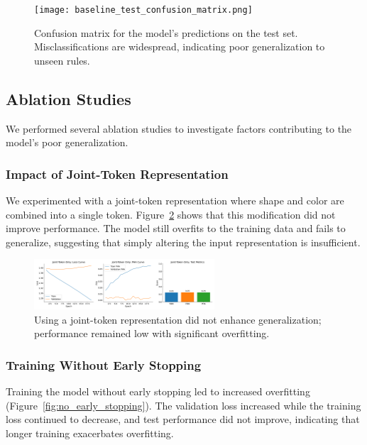 \documentclass{article} %
\begin{document}
\begin{figure}[h!]
\centering
\texttt{[image: baseline\_test\_confusion\_matrix.png]}
\caption{Confusion matrix for the model's predictions on the test set. Misclassifications are widespread, indicating poor generalization to unseen rules.}
\label{fig:test_confusion}
\end{figure}

\subsection{Ablation Studies}

We performed several ablation studies to investigate factors contributing to the model's poor generalization.

\subsubsection{Impact of Joint-Token Representation}

We experimented with a joint-token representation where shape and color are combined into a single token. Figure~\ref{fig:joint_token} shows that this modification did not improve performance. The model still overfits to the training data and fails to generalize, suggesting that simply altering the input representation is insufficient.

\begin{figure}[h!]
\centering
\includegraphics[width=0.6\textwidth]{joint_token_only_combined.png}
\caption{Using a joint-token representation did not enhance generalization; performance remained low with significant overfitting.}
\label{fig:joint_token}
\end{figure}

\subsubsection{Training Without Early Stopping}

Training the model without early stopping led to increased overfitting (Figure~\ref{fig:no_early_stopping}). The validation loss increased while the training loss continued to decrease, and test performance did not improve, indicating that longer training exacerbates overfitting.
\end{document}
